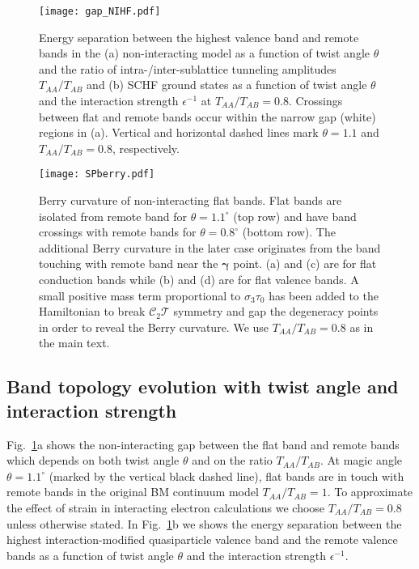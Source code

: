 \documentclass[aps,prl,reprint,amssymb,groupedaddress,twocolumn]{revtex4}
\newcommand{\CT}{$\mathcal{C}_2\mathcal{T}$ }
\begin{document}
\begin{figure}[t!]
	\begin{center}
		\texttt{[image: gap\_NIHF.pdf]}
		\caption{Energy separation between the highest valence band and remote bands in the 
			(a) non-interacting model as a function of twist angle $\theta$ and 
			the ratio of intra-/inter-sublattice tunneling amplitudes $T_{AA}/T_{AB}$ and 
		   (b) SCHF ground states as a function of twist angle $\theta$ and the interaction strength 
			$\epsilon^{-1}$ at $T_{AA}/T_{AB}=0.8$.  Crossings between flat and remote bands occur 
			within the narrow gap (white) regions in (a).  
			Vertical and horizontal dashed lines mark $\theta=1.1$ and $T_{AA}/T_{AB}=0.8$, respectively.  } 
		\label{gapmap}
	\end{center}
\end{figure}

\begin{figure}[t!]
	\begin{center}
		\texttt{[image: SPberry.pdf]}
		\caption{Berry curvature of non-interacting flat bands. Flat bands are isolated from remote band for $\theta=1.1^{\circ}$ (top row)
			and have band crossings with remote bands for $\theta=0.8^{\circ}$ (bottom row).
			The additional Berry curvature in the later case originates from the band touching with remote band near the $\bm{\gamma}$ point.
			(a) and (c) are for flat conduction bands while (b) and (d) are for flat valence bands.
			A small positive mass term proportional to $\sigma_3 \tau_0$ has been added to the Hamiltonian to
			break \CT symmetry and gap the degeneracy points in order to reveal the Berry curvature.
			We use $T_{AA}/T_{AB}=0.8$ as in the main text.} 
		\label{SPberry}
	\end{center}
\end{figure}

\subsection{Band topology evolution with twist angle and interaction strength}
Fig.~\ref{gapmap}a shows the non-interacting gap between the flat band and remote bands 
which depends on both twist angle $\theta$ and on the ratio $T_{AA}/T_{AB}$.
At magic angle $\theta=1.1^{\circ}$ (marked by the vertical black dashed line), 
flat bands are in touch with remote bands in the original BM continuum model $T_{AA}/T_{AB}=1$.
To approximate the effect of strain in interacting electron calculations we choose $T_{AA}/T_{AB}=0.8$ unless
otherwise stated.  In Fig.~\ref{gapmap}b we shows the energy separation between the highest 
interaction-modified quasiparticle valence band and the remote valence bands as a function
of twist angle $\theta$ and the interaction strength $\epsilon^{-1}$.
\end{document}
